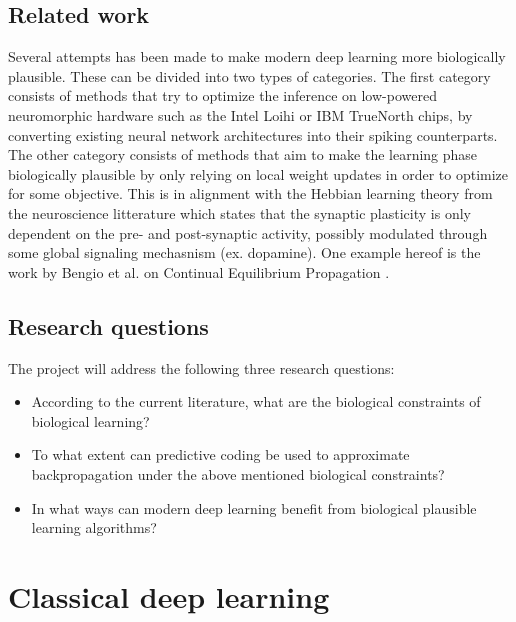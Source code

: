 \documentclass[a4paper,11pt]{article} %
\begin{document}
\subsection{Related work}
Several attempts has been made to make modern deep learning more biologically plausible. These can be divided into two types of categories. The first category consists of methods that try to optimize the inference on low-powered neuromorphic hardware such as the Intel Loihi or IBM TrueNorth chips, by converting existing neural network architectures into their spiking counterparts. The other category consists of methods that aim to make the learning phase biologically plausible by only relying on local weight updates in order to optimize for some objective. This is in alignment with the Hebbian learning theory from the neuroscience litterature which states that the synaptic plasticity is only dependent on the pre- and post-synaptic activity, possibly modulated through some global signaling mechasnism (ex. dopamine). One example hereof is the work by Bengio et al. on Continual Equilibrium Propagation \cite{EqProp}. 

\subsection{Research questions}
The project will address the following three research questions:
\begin{itemize}
  \item According to the current literature, what are the biological constraints of biological learning?
  \item To what extent can predictive coding be used to approximate backpropagation under the above mentioned biological constraints?
  \item In what ways can modern deep learning benefit from biological plausible learning algorithms?
\end{itemize}

\section{Classical deep learning}
\end{document}
